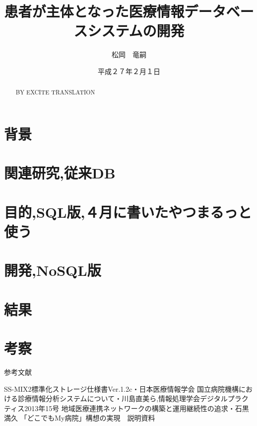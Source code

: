 \documentclass[12pt]{sotsuron}
\title{患者が主体となった医療情報データベースシステムの開発}
\author{松岡　竜嗣}
\date{平成２７年２月１日}
\affiliation{電子機械工学専攻}
\begin{document}
\maketitle
\begin{abstract}

BY EXCITE TRANSLATION
\end{abstract}

\tableofcontents
\clearpage

\section{背景}


\section{関連研究,従来DB}


\section{目的,SQL版,４月に書いたやつまるっと使う}


\section{開発,NoSQL版}


\section{結果}


\section{考察}



\appendix

%
参考文献

\begin{thebibliography}{9}
  SS-MIX2標準化ストレージ仕様書Ver.1.2c・日本医療情報学会
   国立病院機構における診療情報分析システムについて・川島直美ら,情報処理学会デジタルプラクティス2013年15号
   地域医療連携ネットワークの構築と運用継続性の追求・石黒満久
   「どこでもMy病院」構想の実現　説明資料
\end{thebibliography}


\clearpage

\listoffigures
\clearpage

\listoftables
\clearpage
\end{document}
